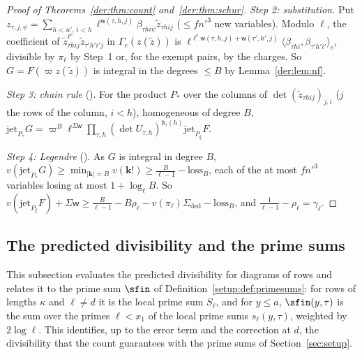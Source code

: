\begin{proof}[Proof of Theorems~\ref{der:thm:count} and~\ref{der:thm:schur}]
\emph{Step 2: substitution.} Put $z_{\tau,j,\psi}=\sum_{h<n',\,i<h}\ell^{\mathsf w(\tau,h,j)}\beta_{\tau hi\psi}
\tilde z_{\tau hij}$ ($\le fn'^3$ new variables). Modulo $\ell$, the coefficient of
$\tilde z_{\tau hij}^{\ell^e}\tilde z_{\tau'h'i'j}$ in $\Gamma_e(z(\tilde z))$ is
$\ell^{\ell^e\mathsf w(\tau,h,j)+\mathsf w(\tau',h',j)}\langle\beta_{\tau hi},\beta_{\tau'h'i'}\rangle_e$,
divisible by $\pi_\ell$ by Step~1 or, for the exempt pairs, by the charges. So
$G=F(\varpi z(\tilde z))$ is integral in the degrees $\le B$ by Lemma~\ref{der:lem:nf}.

\emph{Step 3: chain rule} (). For the product $P_*$ over the
columns of $\det(\tilde z_{\tau hij})_{j,i}$ ($j$ the rows of the column, $i<h$), homogeneous of degree
$B$, $\mathrm{jet}_{P_*}G=\varpi^B\ell^{\Sigma\mathsf w}\prod_{\tau,h}(\det U_{\tau,h})^{\mathfrak d_\tau(h)}
\mathrm{jet}_{P_\xi}F$.

\emph{Step 4: Legendre} (). As $G$ is integral in degree $B$,
$v(\mathrm{jet}_{P_*}G)\ge\min_{|\mathbf k|=B}v(\mathbf k!)\ge\frac B{\ell-1}-\mathrm{loss}_B$, each of
the at most $fn'^3$ variables losing at most $1+\log_\ell B$. So
$v(\mathrm{jet}_{P_\xi}F)+\Sigma\mathsf w\ge\frac B{\ell-1}-B\rho_\ell-v(\pi_\ell)\Sigma_{\mathrm{ded}}-\mathrm{loss}_B$,
and $\frac1{\ell-1}-\rho_\ell=\gamma_\ell$.
\end{proof}

\subsection{The predicted divisibility and the prime sums}\label{der:sec:primesums}

This subsection evaluates the predicted divisibility for diagrams of rows and relates it to the
prime sum $\sfin$ of Definition~\ref{setup:def:primesums}: for rows of lengths $\kappa$ and
$\ell\ne d$ it is the local prime sum $S_\ell$, and for $y\le a$, $\sfin(y,\tau)$ is the sum over
the primes $\ell<x_1$ of the local prime sums $s_\ell(y,\tau)$, weighted by $2\log\ell$. This
identifies, up to the error term and the correction at $d$, the divisibility that the count
guarantees with the prime sums of Section~\ref{sec:setup}.

